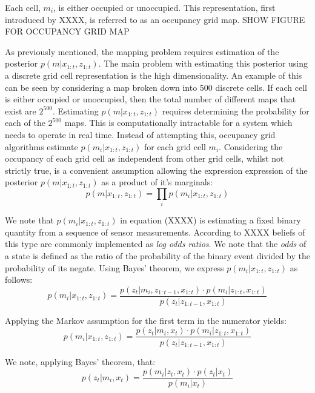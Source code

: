 \documentclass[a4paper]{article}
\begin{document}
Each cell, $m_i$, is either occupied or unoccupied. This representation, first introduced by XXXX, is referred to as an occupancy grid map. SHOW FIGURE FOR OCCUPANCY GRID MAP

As previously mentioned, the mapping problem requires estimation of the posterior $p(m | x_{1:t}, z_{1:t})$. The main problem with estimating this posterior using a discrete grid cell representation is the high dimensionality. An example of this can be seen  by considering a map broken down into 500 discrete cells. If each cell is either occupied or unoccupied, then the total number of different maps that exist are $2^{500}$. Estimating $p(m | x_{1:t}, z_{1:t})$ requires determining the probability for each of the $2^{500}$ maps. This is computationally intractable for a system which needs to operate in real time. Instead of attempting this, occupancy grid algorithms estimate $p(m_i | x_{1:t}, z_{1:t})$ for each grid cell $m_i$. Considering the occupancy of each grid cell as independent from other grid cells, whilst not strictly true, is a convenient assumption allowing the expression expression of the posterior $p(m | x_{1:t}, z_{1:t})$ as a product of it's marginals:
\begin{equation}
p(m | x_{1:t}, z_{1:t}) = \prod_{i} p(m_i | x_{1:t}, z_{1:t})
\end{equation}

We note that $p(m_i | x_{1:t}, z_{1:t})$ in equation (XXXX) is estimating a fixed binary quantity from a sequence of sensor measurements. According to XXXX beliefs of this type are commonly implemented as \textit{log odds ratios}. We note that the \textit{odds} of a state is defined as the ratio of the probability of the binary event divided by the probability of its negate. Using Bayes' theorem, we express $p(m_i | x_{1:t}, z_{1:t})$ as follows:
\begin{equation}
p(m_i | x_{1:t}, z_{1:t}) = \frac{p(z_t | m_i, z_{1:t-1}, x_{1:t}) \cdot p(m_i | z_{1:t}, x_{1:t})}{p(z_t | z_{1:t-1}, x_{1:t})}
\end{equation}

Applying the Markov assumption for the first term in the numerator yields:
\begin{equation}
p(m_i | x_{1:t}, z_{1:t}) = \frac{p(z_t | m_i, x_{t}) \cdot p(m_i | z_{1:t}, x_{1:t})}{p(z_t | z_{1:t-1}, x_{1:t})}
\end{equation}

We note, applying Bayes' theorem, that:
\begin{equation}
p(z_t | m_i, x_t) = \frac{p(m_i | z_t, x_t) \cdot p(z_t | x_t)}{p(m_i | x_t)}
\end{equation}
\end{document}
